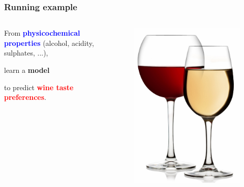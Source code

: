 \documentclass{beamer}
\newcommand{\X}[1]{\textcolor{blue}{#1}}
\newcommand{\y}[1]{\textcolor{red}{#1}}
\newcommand{\model}[1]{\textcolor{mygreen}{#1}}
\begin{document}
\begin{frame}
    \frametitle{Running example}

    \begin{columns}
    \begin{column}{0.5\textwidth}

    \begin{center}
    From {\bf \X{physicochemical properties}} (alcohol, acidity, sulphates, ...),

    \vspace{1cm}
    learn a {\bf \model{model}}
    \vspace{1cm}

    to predict {\bf \y{wine taste preferences}}.

    \end{center}

    \end{column}
    \begin{column}{0.5\textwidth}
      \begin{figure}
      \vspace{-0.5cm}
      \includegraphics[scale=0.6]{./figures/wine.jpg}
      \end{figure}
    \end{column}
    \end{columns}


\end{frame}
\end{document}
